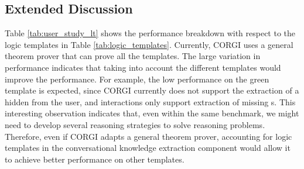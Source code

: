 

\subsection*{Extended Discussion}
Table \ref{tab:user_study_lt} shows the performance breakdown with respect to the logic templates in Table \ref{tab:logic_templates}. %
Currently, CORGI uses a general theorem prover that can prove all the templates. The large variation in performance indicates that taking into account the different templates would improve the performance. For example, the low performance on the green template is expected, since CORGI currently does not support the extraction of a hidden \textAction from the user, and interactions only support extraction of missing \textGoal s. This interesting observation indicates that, even within the same benchmark, we might need to develop several reasoning strategies to solve reasoning problems. Therefore, even if CORGI adapts a general theorem prover, accounting for logic templates in the conversational knowledge extraction component would allow it to achieve better performance on other templates.





